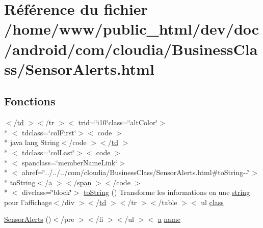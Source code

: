 \hypertarget{_sensor_alerts_8html}{\section{Référence du fichier /home/www/public\-\_\-html/dev/doc/android/com/cloudia/\-Business\-Class/\-Sensor\-Alerts.html}
\label{_sensor_alerts_8html}
}
\subsection*{Fonctions}
\begin{DoxyCompactItemize}
\item 
$<$/\hyperlink{stylesheet_8css_a2635d454965afd759ce151c6f6d1a04a}{td} $>$$<$/tr $>$$<$ trid=\char`\"{}i10\char`\"{}class=\char`\"{}alt\-Color\char`\"{}$>$\\*
$<$ tdclass=\char`\"{}col\-First\char`\"{}$>$$<$ code $>$\\*
 java lang String$<$/code $>$$<$/\hyperlink{stylesheet_8css_a2635d454965afd759ce151c6f6d1a04a}{td} $>$\\*
$<$ tdclass=\char`\"{}col\-Last\char`\"{}$>$$<$ code $>$\\*
$<$ spanclass=\char`\"{}member\-Name\-Link\char`\"{}$>$\\*
$<$ ahref=\char`\"{}../../../com/cloudia/Business\-Class/Sensor\-Alerts.\-html\#to\-String-\/-\/\char`\"{}$>$\\*
 to\-String$<$/\hyperlink{style_8css_a5e8981582017bb8b84c21f148345d1f7}{a} $>$$<$/\hyperlink{stylesheet_8css_a8343996ebcf16220b04e54659aac31cc}{span} $>$$<$/code $>$\\*
$<$ divclass=\char`\"{}block\char`\"{}$>$ \hyperlink{_sensor_alerts_8html_ae6af4371e8504b25f5e3a316bdc3c7bc}{to\-String} () Transforme les informations en une \hyperlink{index-17_8html_abd5fc08c07311a696bb9d8fb49da0fed}{string} pour l'affichage$<$/div $>$$<$/\hyperlink{stylesheet_8css_a2635d454965afd759ce151c6f6d1a04a}{td} $>$$<$/tr $>$$<$/table $>$$<$ ul \hyperlink{_tools_8html_acf06f836132665ba8114f5a414c2403f}{class}
\item 
\hyperlink{_sensor_alerts_8html_a2f68421461ea5e3c075172d95e512cc9}{Sensor\-Alerts} ()$<$/pre $>$$<$/li $>$$<$/ul $>$$<$ \hyperlink{style_8css_a5e8981582017bb8b84c21f148345d1f7}{a} \hyperlink{_cloudia_d_b_8html_ab74e6bf80237ddc4109968cedc58c151}{name}
\item 

\end{DoxyCompactItemize}
